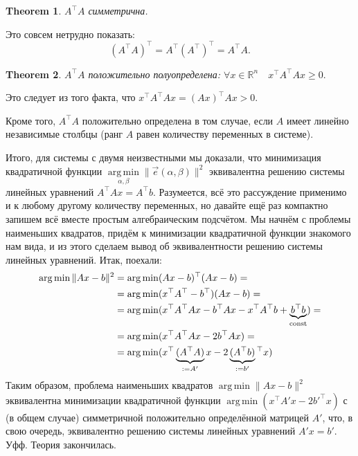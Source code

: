 \documentclass{article}
\DeclareMathOperator*{\argmin}{arg\,min}
\newtheorem{theorem}{Theorem}
\begin{document}
\begin{theorem}
$A^\top A$ симметрична.
\end{theorem}
Это совсем нетрудно показать:
$$
(A^\top A)^\top = A^\top (A^\top)^\top = A^\top A.
$$

\begin{theorem}
	$A^\top A$ положительно полуопределена: $\forall x\in \mathbb R^n\quad x^\top A^\top A x \geq 0.$
\end{theorem}
Это следует из того факта, что $x^\top A^\top A x = (A x)^\top A x > 0$.

Кроме того, $A^\top A$ положительно определена в том случае, если $A$ имеет линейно независимые столбцы (ранг $A$ равен количеству переменных в системе).

\vspace{5mm}

Итого, для системы с двумя неизвестными мы доказали, что минимизация 
квадратичной функции $\argmin\limits_{\alpha, \beta} \|\vec{e}(\alpha, \beta)\|^2$ эквивалентна решению системы линейных уравнений $A^\top A x = A^\top b$. Разумеется, всё это рассуждение применимо и к любому другому количеству переменных, но давайте ещё раз компактно запишем всё вместе простым алгебраическим подсчётом.
Мы начнём с проблемы наименьших квадратов, придём к минимизации квадратичной функции знакомого нам вида,
и из этого сделаем вывод об эквивалентности решению системы линейных уравнений. Итак, поехали:
\begin{align*}
\argmin \| Ax - b \|^2 &= \argmin (Ax-b)^\top (Ax-b) =\\
& = \argmin(x^\top A^\top - b^\top)(Ax-b) = \\
& = \argmin(x^\top A^\top A x - b^\top Ax - x^\top A^\top b + \underbrace{b^\top b}_{\rm const})=\\
& = \argmin(x^\top A^\top A x - 2b^\top Ax) = \\
& = \argmin(x^\top \underbrace{(A^\top A)}_{:=A'} x - 2\underbrace{(A^\top b)}_{:=b'}\phantom{}^\top x)
\end{align*}
Таким образом, проблема наименьших квадратов $\argmin \| Ax - b \|^2$  эквивалентна минимизации квадратичной функции $\argmin (x^\top A' x - 2b'^\top x)$ с (в общем случае) симметричной положительно определённой матрицей $A'$, что, в свою очередь, эквивалентно решению системы линейных уравнений $A'x = b'$. Уфф. Теория закончилась.
\end{document}
